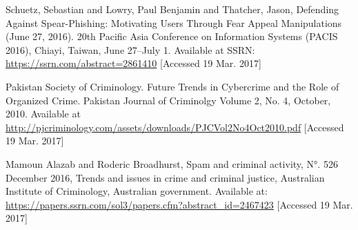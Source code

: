 \documentclass[12pt]{article} %
\begin{document}
\begin{thebibliography}{99}
 Schuetz, Sebastian and Lowry, Paul Benjamin and Thatcher, Jason, Defending Against Spear-Phishing: Motivating Users Through Fear Appeal Manipulations (June 27, 2016). 20th Pacific Asia Conference on Information Systems (PACIS 2016), Chiayi, Taiwan, June 27–July 1. Available at SSRN: \url{https://ssrn.com/abstract=2861410} [Accessed 19 Mar. 2017]

 Pakistan Society of Criminology. Future Trends in Cybercrime and the Role of Organized Crime. Pakistan Journal of Criminolgy Volume 2, No. 4, October, 2010. Available at \url{http://pjcriminology.com/assets/downloads/PJCVol2No4Oct2010.pdf} [Accessed 19 Mar. 2017]

 Mamoun Alazab and Roderic Broadhurst, Spam and criminal activity, N°. 526 December 2016, Trends and issues in crime and criminal justice, Australian Institute of Criminology, Australian government. Available at: \url{https://papers.ssrn.com/sol3/papers.cfm?abstract_id=2467423} [Accessed 19 Mar. 2017]

\end{thebibliography}
\end{document}
